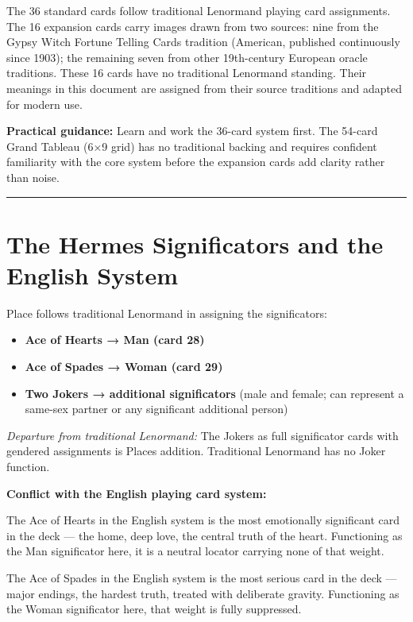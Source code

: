 The 36 standard cards follow traditional Lenormand playing card assignments. The 16 expansion cards carry images drawn from two sources: nine from the Gypsy Witch Fortune Telling Cards tradition (American, published continuously since 1903); the remaining seven from other 19th-century European oracle traditions. These 16 cards have no traditional Lenormand standing. Their meanings in this document are assigned from their source traditions and adapted for modern use.

\textbf{Practical guidance:} Learn and work the 36-card system first. The 54-card Grand Tableau (6×9 grid) has no traditional backing and requires confident familiarity with the core system before the expansion cards add clarity rather than noise.

\begin{center}\rule{0.5\linewidth}{0.5pt}\end{center}

\section{The Hermes Significators and the English System}\label{the-hermes-significators-and-the-english-system}

Place follows traditional Lenormand in assigning the significators:

\begin{itemize}
\tightlist
\item
  \textbf{Ace of Hearts → Man (card 28)}
\item
  \textbf{Ace of Spades → Woman (card 29)}
\item
  \textbf{Two Jokers → additional significators} (male and female; can represent a same-sex partner or any significant additional person)
\end{itemize}

\emph{Departure from traditional Lenormand:} The Jokers as full significator cards with gendered assignments is Place\textquotesingle s addition. Traditional Lenormand has no Joker function.

\textbf{Conflict with the English playing card system:}

The Ace of Hearts in the English system is the most emotionally significant card in the deck --- the home, deep love, the central truth of the heart. Functioning as the Man significator here, it is a neutral locator carrying none of that weight.

The Ace of Spades in the English system is the most serious card in the deck --- major endings, the hardest truth, treated with deliberate gravity. Functioning as the Woman significator here, that weight is fully suppressed.

